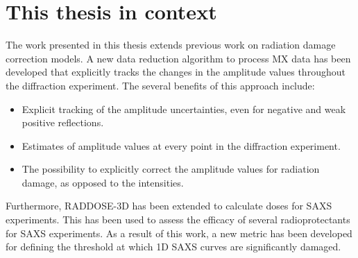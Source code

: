 \section{This thesis in context}
\label{sec:This thesis in context}
	The work presented in this thesis extends previous work on radiation damage correction models.
	A new data reduction algorithm to process MX data has been developed that explicitly tracks the changes in the amplitude values throughout the diffraction experiment.
	The several benefits of this approach include:
    \begin{itemize}
        \item Explicit tracking of the amplitude uncertainties, even for negative and weak positive reflections.
		\item Estimates of amplitude values at every point in the diffraction experiment.
		\item The possibility to explicitly correct the amplitude values for radiation damage, as opposed to the intensities.
    \end{itemize}
	Furthermore, RADDOSE-3D has been extended to calculate doses for SAXS experiments.
	This has been used to assess the efficacy of several radioprotectants for SAXS experiments.
	As a result of this work, a new metric has been developed for defining the threshold at which 1D SAXS curves are significantly damaged.
